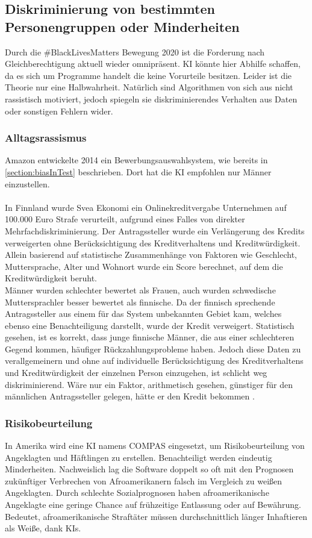 \documentclass[12pt,oneside,a4paper,parskip]{scrbook}
\begin{document}
\subsection{Diskriminierung von bestimmten Personengruppen oder Minderheiten}
Durch die \#BlackLivesMatters Bewegung 2020 ist die Forderung nach Gleichberechtigung aktuell wieder omnipräsent. KI könnte hier Abhilfe schaffen, da es sich um Programme handelt die keine Vorurteile besitzen. Leider ist die Theorie nur eine Halbwahrheit. Natürlich sind Algorithmen von sich aus nicht rassistisch motiviert, jedoch spiegeln sie diskriminierendes Verhalten aus Daten oder sonstigen Fehlern wider.
\subsubsection{Alltagsrassismus}
Amazon entwickelte 2014 ein Bewerbungsauswahlsystem, wie bereits in \ref{section:biasInTest} beschrieben. Dort hat die KI empfohlen nur Männer einzustellen. \\\\
In Finnland wurde Svea Ekonomi ein Onlinekreditvergabe Unternehmen auf 100.000 Euro Strafe verurteilt, aufgrund eines Falles von direkter Mehrfachdiskriminierung. Der Antragssteller wurde ein Verlängerung des Kredits verweigerten ohne Berücksichtigung des Kreditverhaltens und Kreditwürdigkeit. \\Allein basierend auf statistische Zusammenhänge von Faktoren wie Geschlecht, Muttersprache, Alter und Wohnort wurde ein Score berechnet, auf dem die Kreditwürdigkeit beruht. \\Männer wurden schlechter bewertet als Frauen, auch wurden schwedische Muttersprachler besser bewertet als finnische. Da der finnisch sprechende Antragssteller aus einem für das System unbekannten Gebiet kam, welches ebenso eine Benachteiligung darstellt, wurde der Kredit verweigert. Statistisch gesehen, ist es korrekt, dass junge finnische Männer, die aus einer schlechteren Gegend kommen, häufiger Rückzahlungsprobleme haben. Jedoch diese Daten zu verallgemeinern und ohne auf individuelle Berücksichtigung des Kreditverhaltens und Kreditwürdigkeit der einzelnen Person einzugehen, ist schlicht weg diskriminierend.
Wäre nur ein Faktor, arithmetisch gesehen, günstiger für den männlichen Antragssteller gelegen, hätte er den Kredit bekommen \cite{DiskriminierungKredit}.

\subsubsection{Risikobeurteilung}
In Amerika wird eine KI namens COMPAS eingesetzt, um Risikobeurteilung von Angeklagten und Häftlingen zu erstellen. Benachteiligt werden eindeutig Minderheiten. Nachweislich lag die Software doppelt so oft mit den Prognosen zukünftiger Verbrechen von Afroamerikanern falsch im Vergleich zu weißen Angeklagten.
Durch schlechte Sozialprognosen haben afroamerikanische Angeklagte eine geringe Chance auf frühzeitige Entlassung oder auf Bewährung. Bedeutet, afroamerikanische Straftäter müssen durchschnittlich länger Inhaftieren als Weiße, dank KIs.
\end{document}
